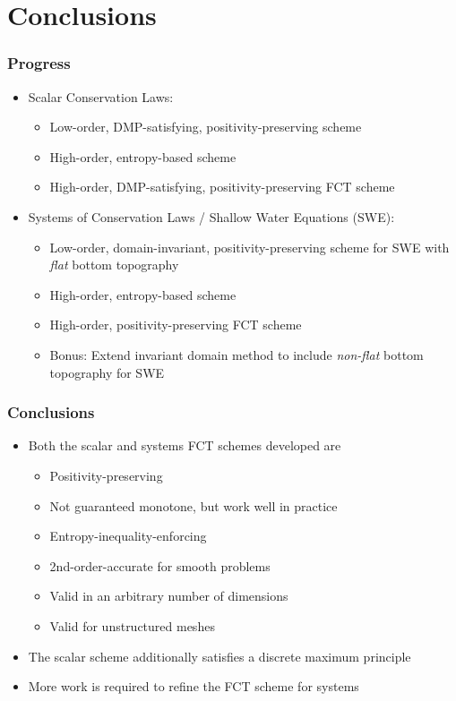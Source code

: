 \documentclass{beamer} \useoutertheme{infolines}
\begin{document}
\section{Conclusions}
\begin{frame}
\frametitle{Progress}

\begin{itemize}
  \item Scalar Conservation Laws:
    \begin{itemize}
      \item[\checked] Low-order, DMP-satisfying, positivity-preserving scheme
      \item[\checked] High-order, entropy-based scheme
      \item[\checked] High-order, DMP-satisfying, positivity-preserving FCT scheme
    \end{itemize}
 \item Systems of Conservation Laws / Shallow Water Equations (SWE):
   \begin{itemize}
     \item[\checked] Low-order, domain-invariant, positivity-preserving scheme
       for SWE with \emph{flat} bottom topography
     \item[\checked] High-order, entropy-based scheme
     \item[\unchecked] High-order, positivity-preserving FCT scheme
     \item[\unchecked] Bonus: Extend invariant domain method to
       include \emph{non-flat} bottom topography for SWE
   \end{itemize}
\end{itemize}

\end{frame}
\begin{frame}
\frametitle{Conclusions}

\begin{itemize}
  \item Both the scalar and systems FCT schemes developed are
    \begin{itemize}
      \item Positivity-preserving
      \item Not guaranteed monotone, but work well in practice
      \item Entropy-inequality-enforcing
      \item 2nd-order-accurate for smooth problems
      \item Valid in an arbitrary number of dimensions
      \item Valid for unstructured meshes
    \end{itemize}
  \item The scalar scheme additionally satisfies a discrete maximum principle
  \item More work is required to refine the FCT scheme for systems
\end{itemize}

\end{frame}
\end{document}

